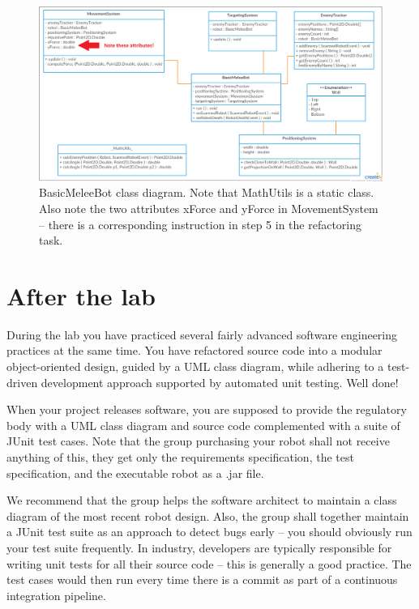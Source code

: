 \documentclass{scrreprt}
\begin{document}
\begin{figure}
\centering
\includegraphics[width=1.1\textwidth]{figures/BasicMeleeBotClassDiagram.png}
\caption{BasicMeleeBot class diagram. Note that MathUtils is a static class. Also note the two attributes xForce and yForce in MovementSystem -- there is a corresponding instruction in step 5 in the refactoring task.}
\label{fig:classDiagram}
\end{figure}

\newpage

\chapter{After the lab}
During the lab you have practiced several fairly advanced software engineering practices at the same time. You have refactored source code into a modular object-oriented design, guided by a UML class diagram, while adhering to a test-driven development approach supported by automated unit testing. Well done!

When your project releases software, you are supposed to provide the regulatory body with a UML class diagram and source code complemented with a suite of JUnit test cases. Note that the group purchasing your robot shall not receive anything of this, they get only the requirements specification, the test specification, and the executable robot as a .jar file.

We recommend that the group helps the software architect to maintain a class diagram of the most recent robot design. Also, the group shall together maintain a JUnit test suite as an approach to detect bugs early -- you should obviously run your test suite frequently. In industry, developers are typically responsible for writing unit tests for all their source code -- this is generally a good practice. The test cases would then run every time there is a commit as part of a continuous integration pipeline.
\end{document}
